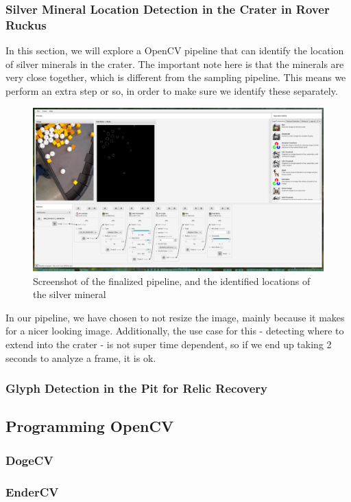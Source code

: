 \documentclass[../main.tex]{subfiles}
\begin{document}
\subsubsection{Silver Mineral Location Detection in the Crater in Rover Ruckus}
In this section, we will explore a OpenCV pipeline that can identify the location of silver minerals in the crater. The important note here is that the minerals are very close together, which is different from the sampling pipeline. This means we perform an extra step or so, in order to make sure we identify these separately. 
\begin{figure}[H]
    \centering
    \includegraphics[width=400pt]{sections/vision/images/opencv/crater_grip_screenshot.png}
    \caption{Screenshot of the finalized pipeline, and the identified locations of the silver mineral}
\end{figure}
In our pipeline, we have chosen to not resize the image, mainly because it makes for a nicer looking image. Additionally, the use case for this - detecting where to extend into the crater - is not super time dependent, so if we end up taking 2 seconds to analyze a frame, it is ok.

\subsubsection{Glyph Detection in the Pit for Relic Recovery}
\subsection{Programming OpenCV}
\subsubsection{DogeCV}
\subsubsection{EnderCV}
\end{document}
